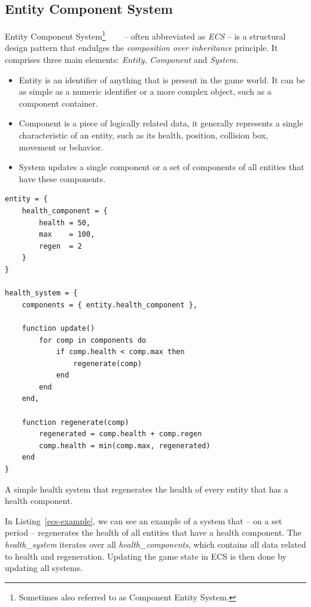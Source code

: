 \subsection{Entity Component System}

Entity Component System\footnote{Sometimes also referred to as Component Entity System.}~\cite{ECS-Wiki}~\cite{ScottBilasGDC}
~\cite{ECS-Gamedev}
-- often abbreviated as \emph{ECS} -- is a structural design pattern that endulges the \emph{composition over inheritance} principle.
It comprises three main elements: \emph{Entity}, \emph{Component} and \emph{System}.

\begin{itemize}
    \item Entity is an identifier of anything that is present in the game world. It can be as simple as a numeric 
        identifier or a more complex object, such as a component container.
    \item Component is a piece of logically related data, it generally represents a single characteristic 
        of an entity, such as its health, position, collision box, movement or behavior.
    \item System updates a single component or a set of components of all entities that have these components.
\end{itemize}

\begin{listing}[h]
    \centering
    \begin{lstlisting}
entity = {
    health_component = {
        health = 50,
        max    = 100,
        regen  = 2
    }
}

health_system = {
    components = { entity.health_component },

    function update()
        for comp in components do
            if comp.health < comp.max then
                regenerate(comp)
            end
        end
    end,

    function regenerate(comp)
        regenerated = comp.health + comp.regen
        comp.health = min(comp.max, regenerated)
    end
}
    \end{lstlisting}
    \caption{A simple health system that regenerates the health of every entity
            that has a health component.}
    \label{ecs-example}
\end{listing}

In Listing~\ref{ecs-example}, we can see an example of a system that -- on a set period -- regenerates the health of all entities
that have a health component. The \emph{health\_system} iterates over all \emph{health\_components}, which contains all
data related to health and regeneration. Updating the game state in ECS is then done by updating all systems.

